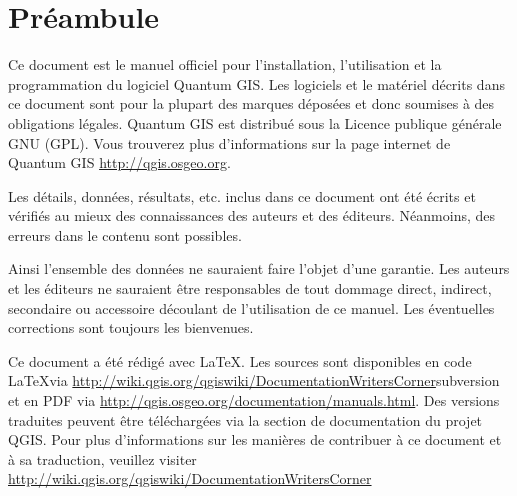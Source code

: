 \newcommand\qgistip[1]{\raggedright\small{#1}}
\renewcommand{\topfraction}{0.85}
\renewcommand{\textfraction}{0.1}
\renewcommand{\floatpagefraction}{0.75}

\thispagestyle{empty}


\section*{Pr\'eambule}


\vspace{1cm}


Ce document est le manuel officiel pour l'installation, l'utilisation et la programmation du logiciel Quantum GIS. Les logiciels et le mat\'eriel d\'ecrits dans ce document sont pour la plupart des marques d\'epos\'ees et donc soumises \`a des obligations l\'egales. Quantum GIS est distribu\'e sous la Licence publique g\'en\'erale GNU (GPL). Vous trouverez plus d'informations sur la page internet de Quantum GIS \url{http://qgis.osgeo.org}.

Les d\'etails, donn\'ees, r\'esultats, etc. inclus dans ce document ont \'et\'e \'ecrits et v\'erifi\'es au mieux des connaissances des auteurs et des \'editeurs. N\'eanmoins, des erreurs dans le contenu sont possibles.

Ainsi l'ensemble des donn\'ees ne sauraient faire l'objet d'une garantie. Les auteurs et les \'editeurs ne sauraient \^etre responsables de tout dommage direct, indirect, secondaire ou accessoire d\'ecoulant de l'utilisation de ce manuel. Les \'eventuelles corrections sont toujours les bienvenues.

Ce document a \'et\'e r\'edig\'e avec \LaTeX. Les sources sont disponibles en code \LaTeX via \url{http://wiki.qgis.org/qgiswiki/DocumentationWritersCorner}{subversion} et en PDF via \url{http://qgis.osgeo.org/documentation/manuals.html}. 
Des versions traduites peuvent \^etre t\'el\'echarg\'ees via la section de documentation du projet QGIS. Pour plus d'informations sur les mani\`eres de contribuer \`a ce document et \`a sa traduction, veuillez visiter \url{http://wiki.qgis.org/qgiswiki/DocumentationWritersCorner} 

